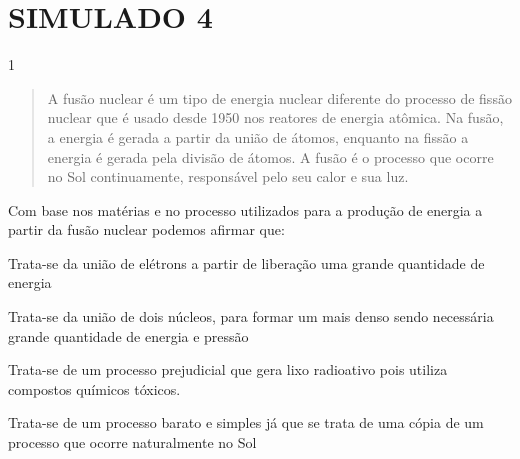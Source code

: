 
\chapter{SIMULADO 4}

\num{1}
\begin{quote}
  A fusão nuclear é um tipo de energia nuclear diferente do processo
  de fissão nuclear que é usado desde 1950 nos reatores de energia
  atômica. Na fusão, a energia é gerada a partir da união de átomos,
  enquanto na fissão a energia é gerada pela divisão de átomos. A fusão
  é o processo que ocorre no Sol continuamente, responsável pelo seu
  calor e sua luz.

\end{quote}

Com base nos matérias e no processo utilizados para a produção de
energia a partir da fusão nuclear podemos afirmar que:

\begin{escolha}
\item
  Trata-se da união de elétrons a partir de liberação uma grande
  quantidade de energia
\item
  Trata-se da união de dois núcleos, para formar um mais denso sendo
  necessária grande quantidade de energia e pressão
\item
  Trata-se de um processo prejudicial que gera lixo radioativo pois
  utiliza compostos químicos tóxicos.
\item
  Trata-se de um processo barato e simples já que se trata de uma cópia
  de um processo que ocorre naturalmente no Sol
\end{escolha}

